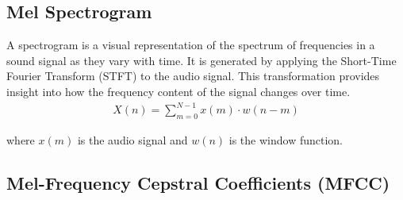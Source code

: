 \subsection{Mel Spectrogram}
A spectrogram is a visual representation of the spectrum of frequencies in a
sound signal as they vary with time. It is generated by applying the Short-Time
Fourier Transform (STFT) to the audio signal. This transformation provides
insight into how the frequency content of the signal changes over time.
\begin{eqnarray}
    X(n) = \sum_{m=0}^{N-1} x(m) \cdot w(n-m)
\end{eqnarray}

where \( x(m) \) is the audio signal and \( w(n) \) is the window function.

\subsection{Mel-Frequency Cepstral Coefficients (MFCC)}

